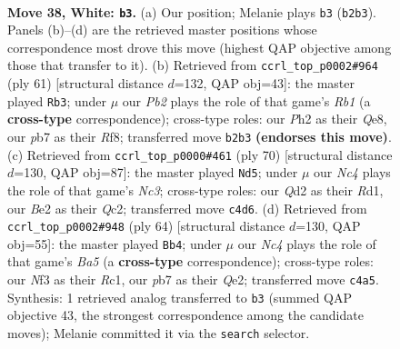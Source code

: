 \documentclass[11pt]{article}
\begin{document}
\clearpage

\begin{figure}[p]\centering
\begin{subfigure}{0.46\textwidth}\centering
\resizebox{\linewidth}{!}{%
\newchessgame
\chessboard[
  setfen={rnbr4/1p2q1k1/4p3/p1p2p1p/PnNP1P2/5NP1/1P1QB1KP/3R3R w - - 3 38},
  showmover=false,
  pgfstyle=straightmove, color=movearrow, markmove={b2-b3}
]}
\caption{}
\end{subfigure}\hfill
\begin{subfigure}{0.46\textwidth}\centering
\resizebox{\linewidth}{!}{%
\newchessgame
\chessboard[
  setfen={1r2qrk1/3bppb1/3n2pp/2R1P3/p1p2PP1/2N4P/1P2QBBK/R7 b - - 2 31},
  showmover=false,
  pgfstyle=straightmove, color=movearrow, markmove={b8-b3}
]}
\caption{}
\end{subfigure}
\\[4pt]
\begin{subfigure}{0.46\textwidth}\centering
\resizebox{\linewidth}{!}{%
\newchessgame
\chessboard[
  setfen={2rrq1k1/4bp2/p5p1/1pp4n/3PP2p/1PNR3P/P1Q3PB/3R3K w - - 0 36},
  showmover=false,
  pgfstyle=straightmove, color=movearrow, markmove={c3-d5}
]}
\caption{}
\end{subfigure}\hfill
\begin{subfigure}{0.46\textwidth}\centering
\resizebox{\linewidth}{!}{%
\newchessgame
\chessboard[
  setfen={4r1k1/1q1nbpp1/p3p2p/Bpr5/2P5/1P3N1P/P3QPP1/2R1R1K1 w - - 0 33},
  showmover=false,
  pgfstyle=straightmove, color=movearrow, markmove={a5-b4}
]}
\caption{}
\end{subfigure}
\caption{\textbf{Move 38, White: \texttt{b3}.} (a) Our position; Melanie plays \texttt{b3} (\texttt{b2b3}). Panels (b)--(d) are the retrieved master positions whose correspondence most drove this move (highest QAP objective among those that transfer to it). (b) Retrieved from \texttt{ccrl\_top\_p0002\#964} (ply 61) [structural distance $d$=132, QAP obj=43]: the master played \texttt{Rb3}; under $\mu$ our \emph{Pb2} plays the role of that game's \emph{Rb1} (a \textbf{cross-type} correspondence); cross-type roles: our \emph{P}h2 as their \emph{Q}e8, our \emph{p}b7 as their \emph{R}f8; transferred move \texttt{b2b3} \textbf{(endorses this move)}. (c) Retrieved from \texttt{ccrl\_top\_p0000\#461} (ply 70) [structural distance $d$=130, QAP obj=87]: the master played \texttt{Nd5}; under $\mu$ our \emph{Nc4} plays the role of that game's \emph{Nc3}; cross-type roles: our \emph{Q}d2 as their \emph{R}d1, our \emph{B}e2 as their \emph{Q}c2; transferred move \texttt{c4d6}. (d) Retrieved from \texttt{ccrl\_top\_p0002\#948} (ply 64) [structural distance $d$=130, QAP obj=55]: the master played \texttt{Bb4}; under $\mu$ our \emph{Nc4} plays the role of that game's \emph{Ba5} (a \textbf{cross-type} correspondence); cross-type roles: our \emph{N}f3 as their \emph{R}c1, our \emph{p}b7 as their \emph{Q}e2; transferred move \texttt{c4a5}. Synthesis: 1 retrieved analog transferred to \texttt{b3} (summed QAP objective 43, the strongest correspondence among the candidate moves); Melanie committed it via the \texttt{search} selector.}
\label{fig:thought-m74}
\end{figure}
\end{document}
